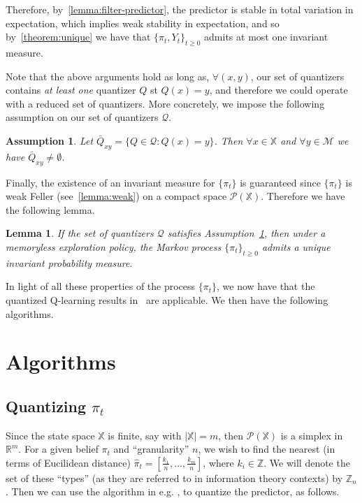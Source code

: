 \documentclass{article}
\newtheorem{lemma}[theorem]{Lemma}
\newtheorem{assumption}{Assumption}[section]
\begin{document}
Therefore, by~\ref{lemma:filter-predictor}, the predictor is stable in total variation in expectation, which implies weak stability in expectation, and so by~\ref{theorem:unique} we have that \( \{\pi_t, Y_t\}_{t\ge0} \) admits at most one invariant measure.

Note that the above arguments hold as long as, \( \forall (x,y) \), our set of quantizers contains \emph{at least one} quantizer \( Q \) st \( Q(x) = y \), and therefore we could operate with a reduced set of quantizers. More concretely, we impose the following assumption on our set of quantizers \( \mathcal{Q} \).

\begin{assumption}\label{assumption:one-bin}
    Let \( \bar{Q}_{xy} = \{Q \in \mathcal{Q} : Q(x) = y\} \). Then \( \forall x \in \mathbb{X} \) and \( \forall y \in \mathcal{M} \) we have \(\bar{Q}_{xy} \neq \emptyset \).

\end{assumption}

Finally, the existence of an invariant measure for \( \{\pi_t\} \) is guaranteed since \( \{\pi_t\} \) is weak Feller (see~\ref{lemma:weak}) on a compact space \( \mathcal{P}(\mathbb{X}) \). Therefore we have the following lemma.

\begin{lemma}\label{lemma:invariant}
    If the set of quantizers \( \mathcal{Q} \) satisfies Assumption~\ref{assumption:one-bin}, then under a memoryless exploration policy, the Markov process \( \{\pi_t\}_{t\ge0} \) admits a unique invariant probability measure.
\end{lemma}

In light of all these properties of the process \( \{\pi_t\} \), we now have that the quantized Q-learning results in~\cite{Kara} are applicable. We then have the following algorithms.

\section{Algorithms}

\subsection{Quantizing \( \pi_t \)}\label{algorithm1}
Since the state space \( \mathbb{X} \) is finite, say with \( |\mathbb{X}| = m \), then \( \mathcal{P}(\mathbb{X}) \) is a simplex in \( \mathbb{R}^m \). For a given belief \( \pi_t \) and ``granularity'' \( n \), we wish to find the nearest (in terms of Eucilidean distance) \( \hat{\pi}_t = [\frac{k_1}{n}, \ldots, \frac{k_m}{n}] \), where \( k_i \in \mathbb{Z} \). We will denote the set of these ``types'' (as they are referred to in information theory contexts) by \( \mathbb{Z}_n \). Then we can use the algorithm in e.g. \cite{Reznik}, \cite{Saldi} to quantize the predictor, as follows. %
\end{document}
